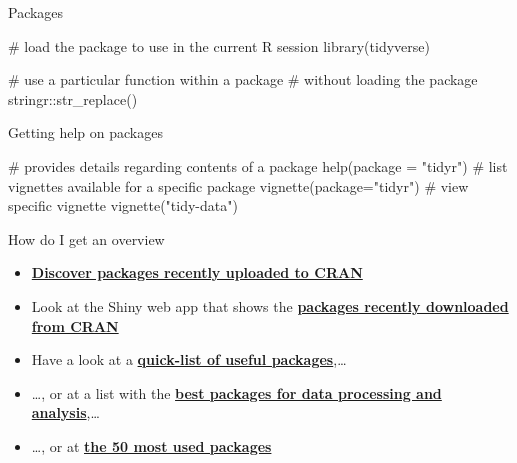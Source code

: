 \documentclass[
  10pt,
  ignorenonframetext,
]{beamer}
\newenvironment{Shaded}{\begin{snugshade}}{\end{snugshade}}
\newcommand{\CommentTok}[1]{\textcolor[rgb]{0.50,0.62,0.50}{#1}}
\newcommand{\DataTypeTok}[1]{\textcolor[rgb]{0.87,0.87,0.75}{#1}}
\newcommand{\KeywordTok}[1]{\textcolor[rgb]{0.94,0.87,0.69}{#1}}
\newcommand{\NormalTok}[1]{\textcolor[rgb]{0.80,0.80,0.80}{#1}}
\newcommand{\OperatorTok}[1]{\textcolor[rgb]{0.94,0.94,0.82}{#1}}
\newcommand{\StringTok}[1]{\textcolor[rgb]{0.80,0.58,0.58}{#1}}
\begin{document}
\begin{frame}[fragile]{Packages}
\protect\hypertarget{packages}{}

\begin{Shaded}
\begin{Highlighting}[]
\CommentTok{# load the package to use in the current R session}
\KeywordTok{library}\NormalTok{(tidyverse)}

\CommentTok{# use a particular function within a package }
\CommentTok{# without loading the package}
\NormalTok{stringr}\OperatorTok{::}\KeywordTok{str_replace}\NormalTok{()}
\end{Highlighting}
\end{Shaded}

\begin{block}{Getting help on packages}

\begin{Shaded}
\begin{Highlighting}[]
\CommentTok{# provides details regarding contents of a package}
\KeywordTok{help}\NormalTok{(}\DataTypeTok{package =} \StringTok{"tidyr"}\NormalTok{)}
\CommentTok{# list vignettes available for a specific package}
\KeywordTok{vignette}\NormalTok{(}\DataTypeTok{package=}\StringTok{"tidyr"}\NormalTok{)}
\CommentTok{# view specific vignette}
\KeywordTok{vignette}\NormalTok{(}\StringTok{"tidy-data"}\NormalTok{)}
\end{Highlighting}
\end{Shaded}

\end{block}

\end{frame}

\begin{frame}{How do I get an overview}
\protect\hypertarget{how-do-i-get-an-overview}{}

\begin{itemize}
\item
  \href{https://mran.microsoft.com/packages/}{\textbf{Discover packages
  recently uploaded to CRAN}}
\item
  Look at the Shiny web app that shows the
  \href{https://gallery.shinyapps.io/cran-gauge/}{\textbf{packages
  recently downloaded from CRAN}}
\item
  Have a look at a
  \href{https://support.rstudio.com/hc/en-us/articles/201057987-Quick-list-of-useful-R-packages}{\textbf{quick-list
  of useful packages}},\ldots{}
\item
  \ldots, or at a list with the
  \href{http://www.computerworld.com/article/2921176/business-intelligence/great-r-packages-for-data-import-wrangling-visualization.html}{\textbf{best
  packages for data processing and analysis}},\ldots{}
\item
  \ldots, or at
  \href{https://www.r-bloggers.com/the-50-most-used-r-packages/}{\textbf{the
  50 most used packages}}
\end{itemize}

\end{frame}
\end{document}
